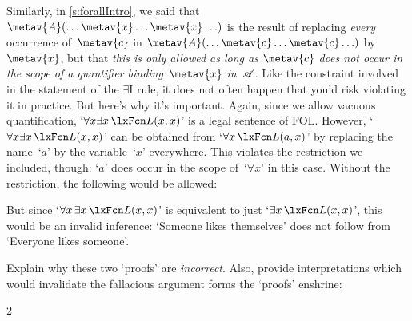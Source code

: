 Similarly, in \cref{s:forallIntro}, we said that $\metav{A}(\ldots
\metav{x} \ldots \metav{x}\ldots)$ is the result of replacing
\emph{every} occurrence of~$\metav{c}$ in $\metav{A}(\ldots \metav{c}
\ldots \metav{c}\ldots)$ by~$\metav{x}$, but that \emph{this is only
allowed as long as $\metav{c}$ does not occur in the scope of a
quantifier binding~$\metav{x}$ in~$\mathscr{A}$}. Like the constraint
involved in the statement of the $\exists$I rule, it does not often
happen that you'd risk violating it in practice. But here's why it's
important. Again, since we allow vacuous quantification, `$\forall
x\exists x\,\atom{L}{x,x}$' is a legal sentence of FOL. However,
`$\forall x\exists x\,\atom{L}{x,x}$' can be obtained from `$\forall
x\,\atom{L}{a,x}$' by replacing the name~`$a$' by the variable~`$x$'
everywhere. This violates the restriction we included, though: `$a$'
does occur in the scope of~`$\forall x$' in this case. Without the
restriction, the following would be allowed:
\begin{fitchproof}
	\PR
\ifHTMLtarget
\else
{}
\fi
\end{fitchproof}
But since `$\forall x\, \exists x\, \atom{L}{x,x}$' is equivalent to
just `$\exists x\, \atom{L}{x,x}$', this would be an invalid
inference: `Someone likes themselves' does not follow from `Everyone
likes someone'.

\practiceproblems
\problempart
Explain why these two `proofs' are \emph{incorrect}. Also, provide interpretations which would invalidate the fallacious argument forms the `proofs' enshrine:
\begin{multicols}{2}
	\begin{fitchproof}
		\PR
	\end{fitchproof}
	\begin{fitchproof}
		\hypo{AE}{\forall x\, \exists y\, \atom{R}{x,y}}\PR
		\Ae{AE}
		\open
			\hypo{ass}{\atom{R}{a,a}}\AS
			\Ei{ass}
		\close
		\Ee{E, ass-Ex}
	\end{fitchproof}
\end{multicols}

